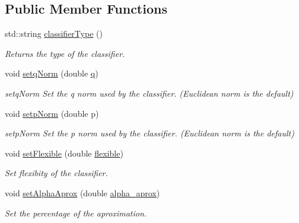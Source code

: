 \subsection*{Public Member Functions}
\begin{DoxyCompactItemize}
\item 
std\+::string \hyperlink{class_primal_classifier_af5117ae286ed7f06430b98f433e9bf62}{classifier\+Type} ()
\begin{DoxyCompactList}\small\item\em Returns the type of the classifier. \end{DoxyCompactList}\item 
void \hyperlink{class_primal_classifier_a22ca554e2a8d33d43c813b6b9b3e4a6a}{setq\+Norm} (double \hyperlink{class_primal_classifier_a746ad2ff93fb77d82ae389f90dbdc89e}{q})
\begin{DoxyCompactList}\small\item\em setq\+Norm Set the q norm used by the classifier. (Euclidean norm is the default) \end{DoxyCompactList}\item 
void \hyperlink{class_primal_classifier_a30cd3926ea5e7341920dcb5480567af1}{setp\+Norm} (double p)
\begin{DoxyCompactList}\small\item\em setp\+Norm Set the p norm used by the classifier. (Euclidean norm is the default) \end{DoxyCompactList}\item 
void \hyperlink{class_primal_classifier_acf3edea17de00a41c33d0fee4fabd4da}{set\+Flexible} (double \hyperlink{class_primal_classifier_af660bbc42f67792e3da8876671b1e9df}{flexible})
\begin{DoxyCompactList}\small\item\em Set flexibity of the classifier. \end{DoxyCompactList}\item 
void \hyperlink{class_primal_classifier_a49be3fca8d8383d98f9d671d1e1f27c7}{set\+Alpha\+Aprox} (double \hyperlink{class_primal_classifier_a1a432d06373100e176e116f995bdcd26}{alpha\+\_\+aprox})
\begin{DoxyCompactList}\small\item\em Set the percentage of the aproximation. \end{DoxyCompactList}\end{DoxyCompactItemize}
